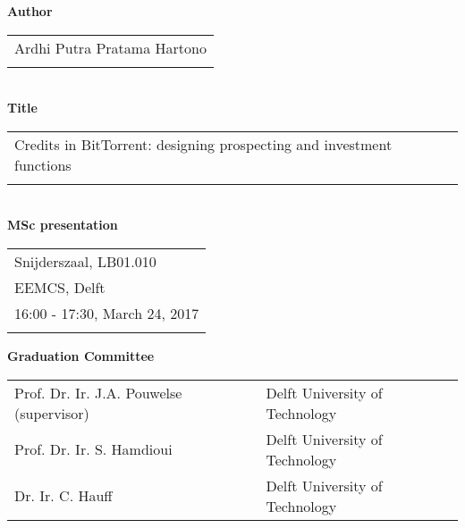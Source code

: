 \thispagestyle{empty}

\noindent \textbf{Author}\\
\begin{tabular}{l}
Ardhi Putra Pratama Hartono\\
\\
\end{tabular}\\
\noindent \textbf{Title}\\
\begin{tabular}{l}
Credits in BitTorrent: designing prospecting and investment functions\\
\\
\end{tabular}\\
\noindent \textbf{MSc presentation}\\
\begin{tabular}{l}
Snijderszaal, LB01.010\\
EEMCS, Delft\\
16:00 - 17:30, March 24, 2017\\
\\
\end{tabular}

\vspace{1.1cm}

\noindent \textbf{Graduation Committee}\\
\begin{tabular}{ll}
Prof. Dr. Ir. J.A. Pouwelse (supervisor) & Delft University of Technology \\
Prof. Dr. Ir. S. Hamdioui & Delft University of Technology \\
Dr. Ir. C. Hauff & Delft University of Technology \\
\end{tabular}

